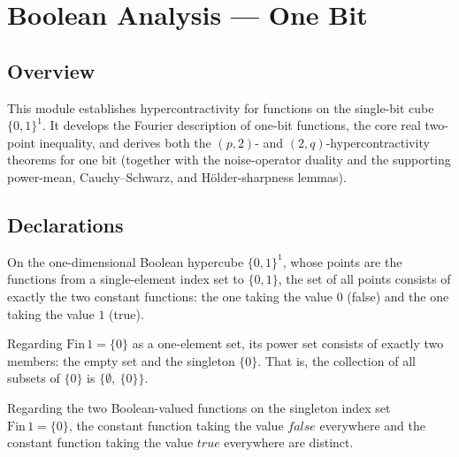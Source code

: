 \chapter{Boolean Analysis — One Bit}
\section{Overview}

This module establishes hypercontractivity for functions on the single-bit cube
$\{0,1\}^1$. It develops the Fourier description of one-bit functions, the core
real two-point inequality, and derives both the $(p,2)$- and $(2,q)$-hypercontractivity
theorems for one bit (together with the noise-operator duality and the supporting
power-mean, Cauchy--Schwarz, and H\"older-sharpness lemmas).

\section{Declarations}

\begin{lemma}
\label{BooleanAnalysis.Hypercontractivity.boolCube1_univ}
\leanok
{}
On the one-dimensional Boolean hypercube $\{0,1\}^1$, whose points are the functions
from a single-element index set to $\{0,1\}$, the set of all points consists of exactly
the two constant functions: the one taking the value $0$ (false) and the one taking the
value $1$ (true).
\end{lemma}

\begin{lemma}
\label{BooleanAnalysis.Hypercontractivity.finsetFin1_univ}
\leanok
{}
Regarding $\mathrm{Fin}\,1 = \{0\}$ as a one-element set, its power set consists of
exactly two members: the empty set and the singleton $\{0\}$. That is, the collection of
all subsets of $\{0\}$ is $\{\emptyset,\ \{0\}\}$.
\end{lemma}

\begin{lemma}
\label{BooleanAnalysis.Hypercontractivity.boolCube1_ne}
\leanok
{}
Regarding the two Boolean-valued functions on the singleton index set $\mathrm{Fin}\,1 =
\{0\}$, the constant function taking the value $\mathit{false}$ everywhere and the
constant function taking the value $\mathit{true}$ everywhere are distinct.
\end{lemma}

